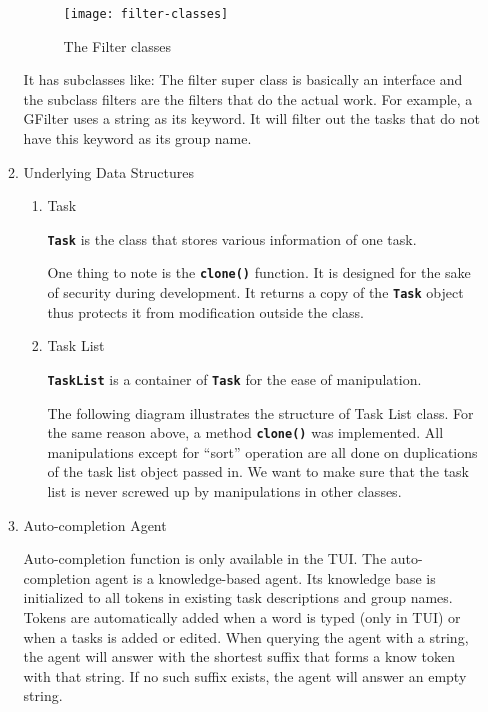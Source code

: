 \documentclass[12pt, a4paper]{article}
\newcommand{\cmdinline}[1]{{\bf \texttt{#1}}}
\begin{document}
\begin{enumerate}
\begin{enumerate}
\begin{figure}[h]
  \centering
  \texttt{[image: filter-classes]}
  \caption{The Filter classes}
\end{figure}

It has subclasses like: 
The filter super class is basically an interface and the subclass filters are the filters that do the
actual work. For example, a GFilter uses a string as its keyword. It will filter out the tasks that
do not have this keyword as its group name.

\item Underlying Data Structures
\begin{enumerate}
\item Task

\cmdinline{Task} is the class that stores various information of one task.

One thing to note is the \cmdinline{clone()} function. It is designed for the
sake of security during development. It returns a copy of the \cmdinline{Task} object thus protects it from modification outside the class.

\item Task List

\cmdinline{TaskList} is a container of \cmdinline{Task} for the ease of manipulation.

The following diagram illustrates the structure of Task List class.
For the same reason above, a method \cmdinline{clone()} was implemented. All manipulations except for ``sort'' operation
are all done on duplications of the task list object passed in. We want to make sure that the task list is never screwed up by manipulations in other classes.
\end{enumerate}

\item Auto-completion Agent

Auto-completion function is only available in the TUI. The auto-completion agent is a knowledge-based agent.
Its knowledge base is initialized to all tokens in existing task descriptions and group names.
Tokens are automatically added when a word is typed (only in TUI) or when a tasks is added
or edited. When querying the agent with a string, the agent will answer with the
shortest suffix that forms a know token with that string. If no such suffix
exists, the agent will answer an empty string.

\end{enumerate}
\end{enumerate}
\end{document}

